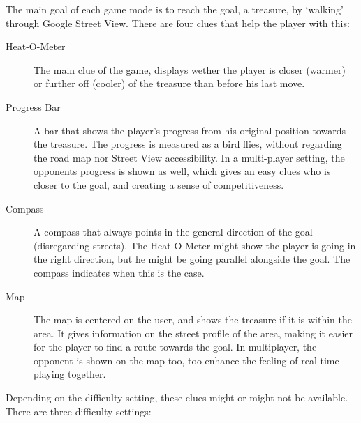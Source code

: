 \documentclass[a4paper,10pt]{article}
\begin{document}
The main goal of each game mode is to reach the goal, a treasure, by `walking' through Google Street View. There are four clues that help the player with this:
\begin{description}
    \item[Heat-O-Meter] The main clue of the game, displays wether the player is closer (warmer) or further off (cooler) of the treasure than before his last move.
    \item[Progress Bar] A bar that shows the player's progress from his original position towards the treasure. The progress is measured as a bird flies, without regarding the road map nor Street View accessibility. In a multi-player setting, the opponents progress is shown as well, which gives an easy clues who is closer to the goal, and creating a sense of competitiveness.
    \item[Compass] A compass that always points in the general direction of the goal (disregarding streets). The Heat-O-Meter might show the player is going in the right direction, but he might be going parallel alongside the goal. The compass indicates when this is the case.
    \item[Map] The map is centered on the user, and shows the treasure if it is within the area. It gives information on the street profile of the area, making it easier for the player to find a route towards the goal. In multiplayer, the opponent is shown on the map too, too enhance the feeling of real-time playing together.
\end{description}

Depending on the difficulty setting, these clues might or might not be available. There are three difficulty settings:
\end{document}

